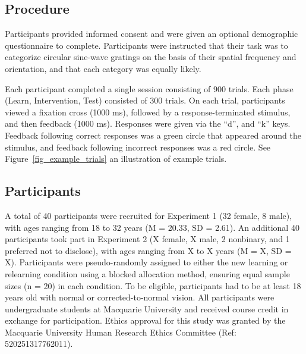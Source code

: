 \documentclass{article}
\begin{document}
\subsection{Procedure}
Participants provided informed consent and were given an
optional demographic questionnaire to complete. Participants
were instructed that their task was to categorize circular
sine-wave gratings on the basis of their spatial frequency
and orientation, and that each category was equally likely.

Each participant completed a single session consisting of
900 trials. Each phase (Learn, Intervention, Test) consisted
of 300 trials. On each trial, participants viewed a fixation
cross (1000 ms), followed by a response-terminated stimulus,
and then feedback (1000 ms).  Responses were given via the
``d'', and ``k'' keys.  Feedback following correct responses
was a green circle that appeared around the stimulus, and
feedback following incorrect responses was a red circle. See
Figure~\ref{fig_example_trials} an illustration of example
trials.

\subsection{Participants}
A total of 40 participants were recruited for Experiment 1
(32 female, 8 male), with ages ranging from 18 to 32 years
(M = 20.33, SD = 2.61). An additional 40 participants took
part in Experiment 2 (X female, X male, 2 nonbinary, and 1
preferred not to disclose), with ages ranging from X to X
years (M = X, SD = X). Participants were pseudo-randomly
assigned to either the new learning or relearning condition
using a blocked allocation method, ensuring equal sample
sizes (n = 20) in each condition. To be eligible,
participants had to be at least 18 years old with normal or
corrected-to-normal vision. All participants were
undergraduate students at Macquarie University and received
course credit in exchange for participation. Ethics approval
for this study was granted by the Macquarie University Human
Research Ethics Committee (Ref: 520251317762011).
\end{document}
